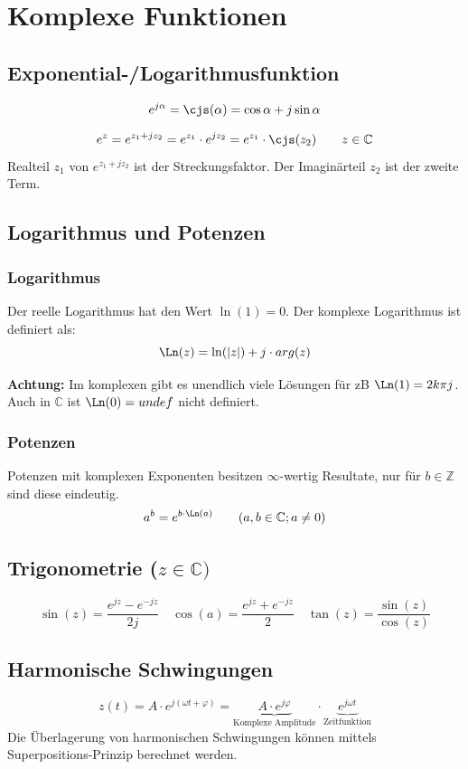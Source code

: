 \section{Komplexe Funktionen}
\subsection{Exponential-/Logarithmusfunktion}\label{expfunc}
\[e^{j\alpha}= \cjs(\alpha) = \cos\alpha + j\sin\alpha\]

\[e^z= e^{z_1 + jz_2} = e^{z_1}\cdot e^{jz_2} = e^{z_1} \cdot \cjs(z_2) \qquad z \in \mathbb{C} \]
Realteil $z_1$ von $e^{z_1+jz_2}$ ist der Streckungsfaktor. Der Imaginärteil $z_2$ ist der zweite Term.

\subsection{Logarithmus und Potenzen}
\subsubsection{Logarithmus}\label{logfunc}
Der reelle Logarithmus hat den Wert $\ln(1) = 0$. Der komplexe Logarithmus ist definiert als:
\[\Ln(z) = \ln(\left|z\right|) + j\cdot arg(z) \]

\noindent\textbf{Achtung:} Im komplexen gibt es unendlich viele Lösungen für zB $\Ln(1)= 2k\pi j$. Auch in $\mathbb{C}$ ist $\Ln(0) = undef$ nicht definiert.

\subsubsection{Potenzen}\label{potfunc}
Potenzen mit komplexen Exponenten besitzen $\infty$-wertig Resultate, nur für $b \in \mathbb{Z}$ sind diese eindeutig.
\[
a^b = e^{b \cdot \Ln(a)} \qquad (a,b \in \mathbb{C};  a \neq 0)
\]

\subsection{Trigonometrie ($z \in \mathbb{C})$}
\[\sin(z) = \frac{e^{jz} -e^{-jz}}{2j} \quad \cos(a) = \frac{e^{jz} +e^{-jz}}{2} \quad \tan(z) = \frac{\sin(z)}{\cos(z)}\]

\subsection{Harmonische Schwingungen}
\[
z(t) = A \cdot e^{j(\omega t + \varphi)} = \underbrace{A \cdot e^{j\varphi}}_\text{Komplexe Amplitude} \cdot \underbrace{e^{j\omega t}}_{\text{Zeitfunktion}}
\]
\noindent Die Überlagerung von harmonischen Schwingungen können mittels Superpositions-Prinzip berechnet werden.

